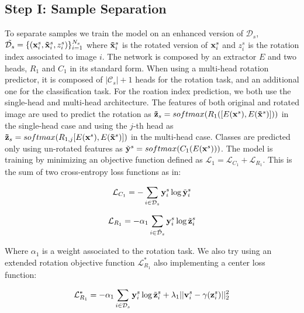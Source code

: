 \documentclass[10pt,twocolumn,letterpaper]{article}
\begin{document}
\subsection{Step I: Sample Separation}

To separate samples we train the model on an enhanced version of $\mathcal{D}_s$, $\tilde{\mathcal{D}_s} = \{({\bf x}_i^s, {\bf \tilde x}_i^s, z_i^s)\}_{i=1}^{N_s}$ where ${\bf \tilde x}_i^s$ is the rotated version of ${\bf x}_i^s$ and $z_i^s$ is the rotation index associated to image $i$.
The network is composed by an extractor $E$ and two heads, $R_1$ and $C_1$ in its standard form.
When using a multi-head rotation predictor, it is composed of $|\mathcal{C}_s|+1$ heads for the rotation task, and an additional one for the classification task.
For the roation index prediction, we both use the single-head and multi-head architecture.
The features of both original and rotated image are used to predict the rotation as ${\bf \tilde z}_s = softmax(R_1([E({\bf x}^s), E({\bf\tilde x}^s)]))$ in the single-head case and using the $j$-th head as ${\bf\tilde{z}}_s = softmax(R_{1,j}[E({\bf x}^s), E({\bf\tilde{x}}^s)])$ in the multi-head case.
Classes are predicted only using un-rotated features as $\tilde{\bf y}^s = softmax(C_1(E({\bf x}^s)))$.
The model is training by minimizing an objective function defined as $\mathcal{L}_1 = \mathcal{L}_{C_1} + \mathcal{L}_{R_1}$.
This is the sum of two cross-entropy loss functions as in:

\begin{equation}
  \mathcal{L}_{C_1} = -\sum_{i\in\mathcal{D}_s} {\bf y}_i^s \log \tilde{\bf y}_i^s
\end{equation}
\label{eq:baseloss_class}

\begin{equation}
  \mathcal{L}_{R_1} = -\alpha_1\sum_{i\in\mathcal{\tilde{D}}_s} {\bf y}_i^s \log \tilde{{\bf z}}_i^s
\end{equation}
\label{eq:baseloss_rot}

Where $\alpha_1$ is a weight associated to the rotation task.
We also try using an extended rotation objective function $\mathcal{L}_{R_1}^*$ also implementing a center loss function\cite{CenterLoss}:

\begin{equation}
  \mathcal{L}_{R_1}^* = -\alpha_1\sum_{i\in\mathcal{D}_s} {\bf y}_i^s \log \tilde{{\bf z}}_i^s+\lambda_1||{\bf v}_i^s-\gamma({\bf z}_i^s)||_2^2
\end{equation}
\label{eq:center_loss}
\end{document}
